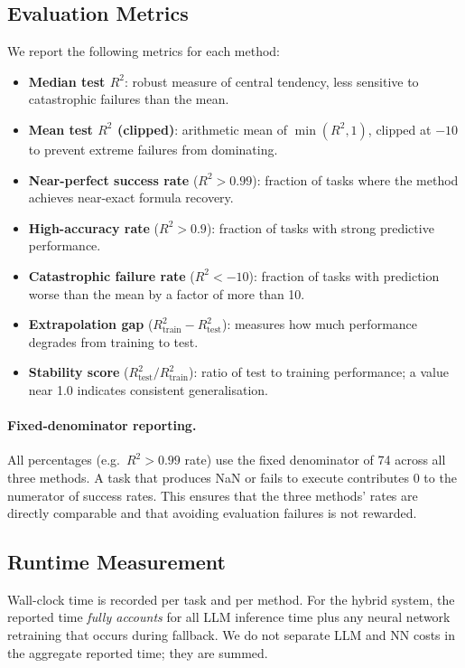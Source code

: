 \documentclass[twoside,11pt]{article}
\newcommand{\Rsq}{R^{2}}
\newcommand{\Rtrain}{R^{2}_{\mathrm{train}}}
\newcommand{\Rtest}{R^{2}_{\mathrm{test}}}
\begin{document}
\subsection{Evaluation Metrics}
\label{sec:setup_metrics}

We report the following metrics for each method:
\begin{itemize}
  \item \textbf{Median test $\Rsq$}: robust measure of central tendency, less
    sensitive to catastrophic failures than the mean.
  \item \textbf{Mean test $\Rsq$ (clipped)}: arithmetic mean of $\min(\Rsq, 1)$,
    clipped at $-10$ to prevent extreme failures from dominating.
  \item \textbf{Near-perfect success rate} ($\Rsq > 0.99$): fraction of tasks where
    the method achieves near-exact formula recovery.
  \item \textbf{High-accuracy rate} ($\Rsq > 0.9$): fraction of tasks with strong
    predictive performance.
  \item \textbf{Catastrophic failure rate} ($\Rsq < -10$): fraction of tasks with
    prediction worse than the mean by a factor of more than 10.
  \item \textbf{Extrapolation gap} ($\Rtrain - \Rtest$): measures how much
    performance degrades from training to test.
  \item \textbf{Stability score} ($\Rtest / \Rtrain$): ratio of test to training
    performance; a value near 1.0 indicates consistent generalisation.
\end{itemize}

\paragraph{Fixed-denominator reporting.}
All percentages (e.g.\ $\Rsq > 0.99$ rate) use the fixed denominator of 74 across
all three methods.  A task that produces NaN or fails to execute contributes 0 to
the numerator of success rates.  This ensures that the three methods' rates are
directly comparable and that avoiding evaluation failures is not rewarded.

\subsection{Runtime Measurement}
\label{sec:timing_setup}

Wall-clock time is recorded per task and per method.  For the hybrid system,
the reported time \emph{fully accounts} for all LLM inference time plus any
neural network retraining that occurs during fallback.  We do not separate
LLM and NN costs in the aggregate reported time; they are summed.
\end{document}
